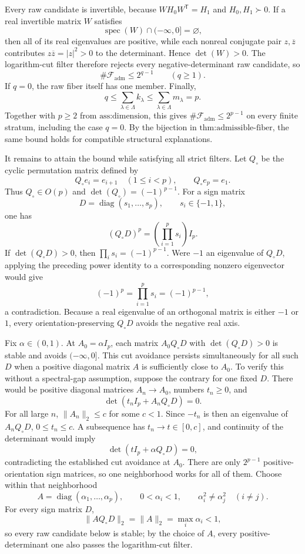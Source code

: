 Every raw candidate is invertible, because \(WH_0W^{\mathsf T}=H_1\) and \(H_0,H_1\succ0\).  If a real invertible matrix \(W\) satisfies
\[
 \operatorname{spec}(W)\cap(-\infty,0]=\varnothing,
\]
then all of its real eigenvalues are positive, while each nonreal conjugate pair \(z,\overline z\) contributes \(z\overline z=|z|^2>0\) to the determinant.  Hence \(\det(W)>0\).  The logarithm-cut filter therefore rejects every negative-determinant raw candidate, so
\[
 \#\mathcal F_{\mathrm{adm}}\leq 2^{q-1}\qquad(q\geq1).
\]
If \(q=0\), the raw fiber itself has one member.  Finally,
\[
 q\leq\sum_{\lambda\in\Lambda}k_\lambda
 \leq\sum_{\lambda\in\Lambda}m_\lambda=p.
\]
Together with \(p\geq2\) from \(\text{ass:dimension}\), this gives \(\#\mathcal F_{\mathrm{adm}}\leq2^{p-1}\) on every finite stratum, including the case \(q=0\).  By the bijection in \(\text{thm:admissible-fiber}\), the same bound holds for compatible structural explanations.

It remains to attain the bound while satisfying all strict filters.  Let \(Q_\circ\) be the cyclic permutation matrix defined by
\[
 Q_\circ e_i=e_{i+1}\quad(1\leq i<p),
 \qquad Q_\circ e_p=e_1.
\]
Thus \(Q_\circ\in O(p)\) and \(\det(Q_\circ)=(-1)^{p-1}\).  For a sign matrix
\[
 D=\operatorname{diag}(s_1,\ldots,s_p),
 \qquad s_i\in\{-1,1\},
\]
one has
\[
 (Q_\circ D)^p=\left(\prod_{i=1}^p s_i\right)I_p.
\]
If \(\det(Q_\circ D)>0\), then \(\prod_i s_i=(-1)^{p-1}\).  Were \(-1\) an eigenvalue of \(Q_\circ D\), applying the preceding power identity to a corresponding nonzero eigenvector would give
\[
 (-1)^p=\prod_{i=1}^p s_i=(-1)^{p-1},
\]
a contradiction.  Because a real eigenvalue of an orthogonal matrix is either \(-1\) or \(1\), every orientation-preserving \(Q_\circ D\) avoids the negative real axis.

Fix \(\alpha\in(0,1)\).  At \(A_0=\alpha I_p\), each matrix \(A_0Q_\circ D\) with \(\det(Q_\circ D)>0\) is stable and avoids \(( -\infty,0]\).  This cut avoidance persists simultaneously for all such \(D\) when a positive diagonal matrix \(A\) is sufficiently close to \(A_0\).  To verify this without a spectral-gap assumption, suppose the contrary for one fixed \(D\).  There would be positive diagonal matrices \(A_n\to A_0\), numbers \(t_n\geq0\), and
\[
 \det(t_nI_p+A_nQ_\circ D)=0.
\]
For all large \(n\), \(\lVert A_n\rVert_2\leq c\) for some \(c<1\).  Since \(-t_n\) is then an eigenvalue of \(A_nQ_\circ D\), \(0\leq t_n\leq c\).  A subsequence has \(t_n\to t\in[0,c]\), and continuity of the determinant would imply
\[
 \det(tI_p+\alpha Q_\circ D)=0,
\]
contradicting the established cut avoidance at \(A_0\).  There are only \(2^{p-1}\) positive-orientation sign matrices, so one neighborhood works for all of them.  Choose within that neighborhood
\[
 A=\operatorname{diag}(\alpha_1,\ldots,\alpha_p),
 \qquad 0<\alpha_i<1,
 \qquad \alpha_i^2\neq\alpha_j^2\quad(i\neq j).
\]
For every sign matrix \(D\),
\[
 \lVert AQ_\circ D\rVert_2=\lVert A\rVert_2
 =\max_i\alpha_i<1,
\]
so every raw candidate below is stable; by the choice of \(A\), every positive-determinant one also passes the logarithm-cut filter.


